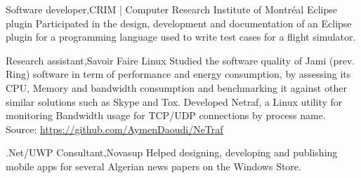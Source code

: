     \resumeSubheading
    {Software developer,}{CRIM | Computer Research Institute of Montréal}{}
    {}
      \resumeItemListStart
      \renewcommand{\labelitemii}{\raisebox{.25cm}{$\bullet$}}
        \resumeItem
         {Eclipse plugin}
         {Participated in the design, development and documentation of an Eclipse plugin for a programming language 
          used to write test cases for a flight simulator.}
        \renewcommand{\labelitemii}{\scriptsize \raisebox{.0cm}{\ding{118}}}
      \resumeItemListEnd

    \resumeSubheading
    {Research assistant,}{Savoir Faire Linux}{}{}
      \resumeItemListStart
        \renewcommand{\labelitemii}{\raisebox{.45cm}{$\bullet$}}
          {Studied the software quality of Jami (prev. Ring) software in term of performance and energy consumption, by assessing 
          its CPU, Memory and bandwidth consumption and benchmarking it against other similar solutions such as Skype and Tox.}
          \renewcommand{\labelitemii}{\raisebox{.25cm}{$\bullet$}}
          {Developed Netraf, a Linux utility for monitoring Bandwidth usage for TCP/UDP connections by process name.
          Source: \underline{\url{https://github.com/AymenDaoudi/NeTraf}}}
        \renewcommand{\labelitemii}{\scriptsize \raisebox{.0cm}{\ding{118}}}
      \resumeItemListEnd 

    \resumeSubheading
    {.Net/UWP Consultant,}{Novasup}{}{}
      \resumeItemListStart
      \renewcommand{\labelitemii}{\raisebox{.2cm}{$\bullet$}}
          {Helped designing, developing and publishing mobile apps for several Algerian news papers on the Windows Store.}
        \renewcommand{\labelitemii}{\scriptsize \raisebox{.0cm}{\ding{118}}}
      \resumeItemListEnd 
    
